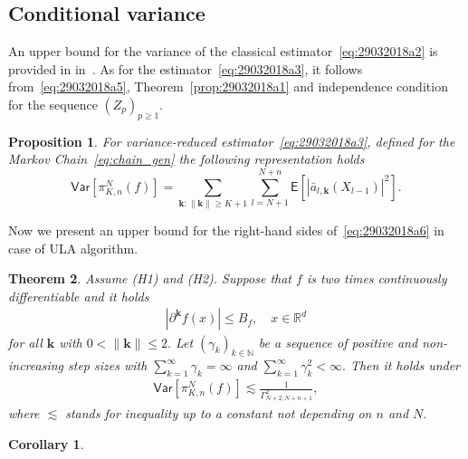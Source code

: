 \documentclass[bj]{imsart}
\newtheorem{thm}{Theorem}
\newtheorem{prop}[thm]{Proposition}
\newtheorem{cor}{Corollary}
\begin{document}
\subsection{Conditional variance}
An upper bound for the variance of the classical estimator~\eqref{eq:29032018a2}
is provided in  in~\cite[Theorem~17]{durmus:moulines:2017}.
As for the estimator~\eqref{eq:29032018a3}, 
it follows from~\eqref{eq:29032018a5}, Theorem~\ref{prop:29032018a1} and independence condition for the sequence $(Z_p)_{p \geq 1}$.
\begin{prop}
\label{cond_var_dec}
	For variance-reduced estimator~\eqref{eq:29032018a3}, defined for the Markov Chain~\eqref{eq:chain_gen} the following representation holds
\begin{equation}\label{eq:29032018a6}
\mathsf{Var}\left[\pi_{K,n}^{N}(f)\right]
=\sum_{\mathbf k\colon \|\mathbf k\|\ge K+1}
\sum_{l=N+1}^{N+n}
\mathsf{E}\left[\left|\bar a_{l,\mathbf{k}}(X_{l-1})\right|^{2}\right].
\end{equation}
\end{prop}
Now we present an upper bound for the right-hand sides of~\eqref{eq:29032018a6} in case of ULA algorithm.
\begin{thm}\label{th:mr}
Assume (H1) and (H2).
Suppose that $f$  is two times continuously differentiable
and it holds
\begin{eqnarray*}
|\partial^{\mathbf{k}} f(x)|\le  B_f, \quad
x\in\mathbb R^d
\end{eqnarray*}
for all \(\mathbf{k}\) with \(0<\|\mathbf{k}\|\leq  2.\) Let $(\gamma_k)_{k\in\mathbb N}$ be a sequence of positive
and non-increasing step sizes with $\sum_{k=1}^\infty \gamma_k=\infty$ and $\sum_{k=1}^\infty \gamma^2_k<\infty.$ 
Then it holds under 
\begin{eqnarray}
\label{eq:var-bound}
\mathsf{Var}\left[\pi_{K,n}^{N}(f)\right]\lesssim \frac{1}{\Gamma^2_{N+2,N+n+1}},
\end{eqnarray}
where \(\lesssim\) stands for inequality up to a constant not depending  on \(n\) and \(N.\)
\end{thm}
\begin{cor}

\end{cor}
\end{document}
